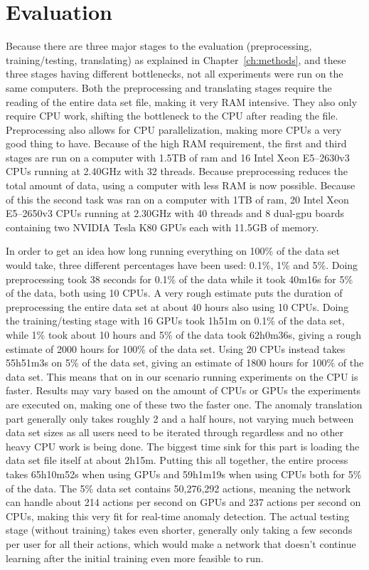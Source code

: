 \chapter{Evaluation}\label{ch:evaluation}

Because there are three major stages to the evaluation (preprocessing, training/testing, translating) as explained in Chapter~\ref{ch:methods}, and these three stages having different bottlenecks, not all experiments were run on the same computers. Both the preprocessing and translating stages require the reading of the entire data set file, making it very RAM intensive. They also only require CPU work, shifting the bottleneck to the CPU after reading the file. Preprocessing also allows for CPU parallelization, making more CPUs a very good thing to have. Because of the high RAM requirement, the first and third stages are run on a computer with 1.5TB of ram and 16 Intel Xeon E5--2630v3 CPUs running at 2.40GHz with 32 threads. Because preprocessing reduces the total amount of data, using a computer with less RAM is now possible.  Because of this the second task was ran on a computer with 1TB of ram, 20 Intel Xeon E5--2650v3 CPUs running at 2.30GHz with 40 threads and 8 dual-gpu boards containing two NVIDIA Tesla K80 GPUs each with 11.5GB of memory. 

In order to get an idea how long running everything on 100\% of the data set would take, three different percentages have been used: 0.1\%, 1\% and 5\%. Doing preprocessing took 38 seconds for 0.1\% of the data while it took 40m16s for 5\% of the data, both using 10 CPUs. A very rough estimate puts the duration of preprocessing the entire data set at about 40 hours also using 10 CPUs. Doing the training/testing stage with 16 GPUs took 1h51m on 0.1\% of the data set, while 1\% took about 10 hours and 5\% of the data took 62h0m36s, giving a rough estimate of 2000 hours for 100\% of the data set. Using 20 CPUs instead takes 55h51m3s on 5\% of the data set, giving an estimate of 1800 hours for 100\% of the data set. This means that on in our scenario running experiments on the CPU is faster. Results may vary based on the amount of CPUs or GPUs the experiments are executed on, making one of these two the faster one. The anomaly translation part generally only takes roughly 2 and a half hours, not varying much between data set sizes as all users need to be iterated through regardless and no other heavy CPU work is being done. The biggest time sink for this part is loading the data set file itself at about 2h15m. Putting this all together, the entire process takes 65h10m52s when using GPUs and 59h1m19s when using CPUs both for 5\% of the data. The 5\% data set contains 50,276,292 actions, meaning the network can handle about 214 actions per second on GPUs and 237 actions per second on CPUs, making this very fit for real-time anomaly detection. The actual testing stage (without training) takes even shorter, generally only taking a few seconds per user for all their actions, which would make a network that doesn't continue learning after the initial training even more feasible to run.